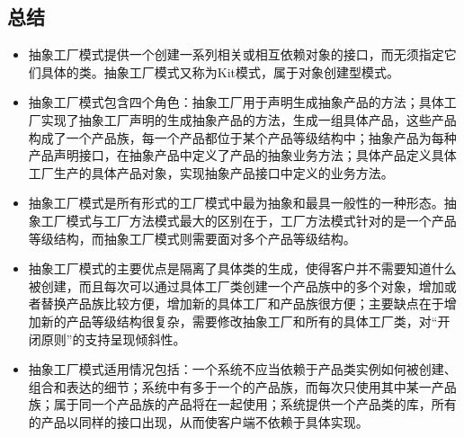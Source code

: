 \documentclass[letterpaper,10pt,english]{sphinxmanual}
\begin{document}
\subsection{总结}
\label{\detokenize{creational_patterns/abstract_factory:id16}}\begin{itemize}
\item {} 
\sphinxAtStartPar
抽象工厂模式提供一个创建一系列相关或相互依赖对象的接口，而无须指定它们具体的类。抽象工厂模式又称为Kit模式，属于对象创建型模式。

\item {} 
\sphinxAtStartPar
抽象工厂模式包含四个角色：抽象工厂用于声明生成抽象产品的方法；具体工厂实现了抽象工厂声明的生成抽象产品的方法，生成一组具体产品，这些产品构成了一个产品族，每一个产品都位于某个产品等级结构中；抽象产品为每种产品声明接口，在抽象产品中定义了产品的抽象业务方法；具体产品定义具体工厂生产的具体产品对象，实现抽象产品接口中定义的业务方法。

\item {} 
\sphinxAtStartPar
抽象工厂模式是所有形式的工厂模式中最为抽象和最具一般性的一种形态。抽象工厂模式与工厂方法模式最大的区别在于，工厂方法模式针对的是一个产品等级结构，而抽象工厂模式则需要面对多个产品等级结构。

\item {} 
\sphinxAtStartPar
抽象工厂模式的主要优点是隔离了具体类的生成，使得客户并不需要知道什么被创建，而且每次可以通过具体工厂类创建一个产品族中的多个对象，增加或者替换产品族比较方便，增加新的具体工厂和产品族很方便；主要缺点在于增加新的产品等级结构很复杂，需要修改抽象工厂和所有的具体工厂类，对“开闭原则”的支持呈现倾斜性。

\item {} 
\sphinxAtStartPar
抽象工厂模式适用情况包括：一个系统不应当依赖于产品类实例如何被创建、组合和表达的细节；系统中有多于一个的产品族，而每次只使用其中某一产品族；属于同一个产品族的产品将在一起使用；系统提供一个产品类的库，所有的产品以同样的接口出现，从而使客户端不依赖于具体实现。

\end{itemize}

\sphinxstepscope
\end{document}
